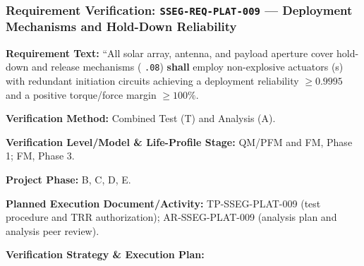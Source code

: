 \subsubsection{Requirement Verification: \texttt{SSEG-REQ-PLAT-009} --- Deployment Mechanisms and Hold-Down Reliability}
\label{ver:SSEG-REQ-PLAT-009}
\textbf{Requirement Text:} ``All solar array, antenna, and payload aperture cover hold-down and release mechanisms ( \texttt{.08}) \textbf{shall} employ non-explosive actuators (s) with redundant initiation circuits achieving a deployment reliability $\ge 0.9995$ and a positive torque/force margin $\ge 100\%$.
\par\textbf{Verification Method:} Combined Test (T) and Analysis (A).
\par\textbf{Verification Level/Model \& Life-Profile Stage:} QM/PFM and FM, Phase 1; FM, Phase 3.
\par\textbf{Project Phase:} B, C, D, E.
\par\textbf{Planned Execution Document/Activity:} TP-SSEG-PLAT-009 (test procedure and TRR authorization); AR-SSEG-PLAT-009 (analysis plan and analysis peer review).
\par\textbf{Verification Strategy \& Execution Plan:}
